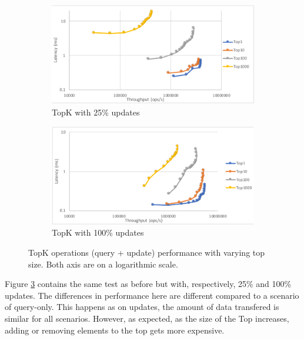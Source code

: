 \documentclass{vldb}
\newcommand{\grumbler}[2]{{\color{red}{\bf #1:} #2}}
\renewcommand{\grumbler}[2]{}
\newcommand{\andre}[1]{\grumbler{andre}{#1}}
\begin{document}
\begin{figure}
	\centering
	\begin{subfigure}{.5\linewidth}
		\centering
		\includegraphics[width=.97\linewidth]{TopKTopSize25upd_cut}
		\caption{TopK with 25\% updates}
		\label{fig:TopkSize25upd}
	\end{subfigure}%
	\begin{subfigure}{.5\linewidth}
		\centering
		\includegraphics[width=.97\linewidth]{TopKTopSize100upd_cut}
		\caption{TopK with 100\% updates}
		\label{fig:TopkSize100upd}
	\end{subfigure}
	\caption{TopK operations (query + update) performance with varying top size. Both axis are on a logarithmic scale.}
	\label{fig:TopkSize25_100upd}
\end{figure}


Figure \ref{fig:TopkSize25_100upd} contains the same test as before but with, respectively, 25\% and 100\% updates.
The differences in performance here are different compared to a scenario of query-only.
This happens as on updates, the amount of data transfered is similar for all scenarios. 
However, as expected, as the size of the Top increases, adding or removing elements to the top gets more expensive.
\andre{Not sure if/how I explain this. I believe the reason why it becomes more expensive is because of when the TopK needs to search for the ``new minimum'' of the top - since the elements ``not in top'' are stored as a set, sometimes that entire set needs to be searched upon to find a new minimum.}
\end{document}
